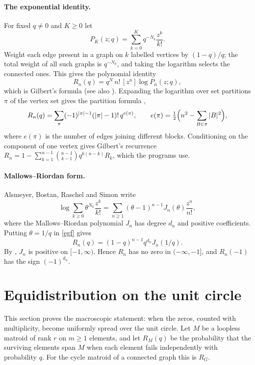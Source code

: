 \documentclass[11pt,a4paper]{article}
\theoremstyle{remark}
\newcommand{\coef}[1]{[z^{#1}]}
\begin{document}
\paragraph{The exponential identity.} For fixed $q\ne0$ and $K\ge0$ let
\[
P_K(z;q)=\sum_{k=0}^{K}q^{-N_k}\frac{z^k}{k!}.
\]
Weight each edge present in a graph on $k$ labelled vertices by $(1-q)/q$; the total weight of all such graphs is $q^{-N_k}$, and taking the logarithm selects the connected ones. This gives the polynomial identity
\begin{equation}\label{egf}
R_n(q)=q^{N}\,n!\,\coef n\log P_n(z;q),
\end{equation}
which is Gilbert's formula \cite[eq.~(3)]{Gilbert} (see also \cite[eq.~(3.9)]{SS}). Expanding the logarithm over set partitions $\pi$ of the vertex set gives the partition formula \cite[\S2]{Gilbert}, \cite[eqs.~(3.48), (3.50)]{SS}
\begin{equation}\label{partition}
R_n(q)=\sum_{\pi}(-1)^{|\pi|-1}(|\pi|-1)!\,q^{e(\pi)},\qquad e(\pi)=\tfrac12\Bigl(n^2-\sum_{B\in\pi}|B|^2\Bigr),
\end{equation}
where $e(\pi)$ is the number of edges joining different blocks. Conditioning on the component of one vertex gives Gilbert's recurrence $R_n=1-\sum_{k=1}^{n-1}\binom{n-1}{k-1}q^{k(n-k)}R_k$, which the programs use.

\paragraph{Mallows--Riordan form.} Alsmeyer, Bostan, Raschel and Simon \cite[eq.~(2)]{ABRS} write
\[\log\sum_{k\ge0}\theta^{N_k}\frac{z^k}{k!}=\sum_{n\ge1}(\theta-1)^{n-1}J_n(\theta)\frac{z^n}{n!},\]
where the Mallows--Riordan polynomial $J_n$ has degree $d_n$ and positive coefficients. Putting $\theta=1/q$ in \eqref{egf} gives
\begin{equation}\label{MR}
R_n(q)=(1-q)^{n-1}q^{d_n}J_n(1/q).
\end{equation}
By \cite[Remark~2.2]{ABRS}, $J_n$ is positive on $[-1,\infty)$. Hence $R_n$ has no zero in $(-\infty,-1]$, and $R_n(-1)$ has the sign $(-1)^{d_n}$.

\section{Equidistribution on the unit circle}\label{sec:global}
This section proves the macroscopic statement: when the zeros, counted with multiplicity, become uniformly spread over the unit circle. Let $M$ be a loopless matroid of rank $r$ on $m\ge1$ elements, and let $R_M(q)$ be the probability that the surviving elements span $M$ when each element fails independently with probability $q$. For the cycle matroid of a connected graph this is $R_G$.
\end{document}
